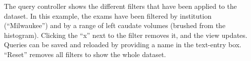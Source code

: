 \label{fig:query}
The query controller shows the different filters that have been applied to the dataset. In this example, the exams have been filtered by institution (``Milwaukee'') and by a range of left caudate volumes (brushed from the histogram). Clicking the ``x'' next to the filter removes it, and the view updates. Queries can be saved and reloaded by providing a name in the text-entry box. ``Reset'' removes all filters to show the whole dataset.